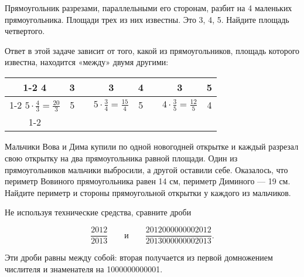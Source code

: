 \begin{itemize}

\itA Прямоугольник разрезами, параллельными его сторонам, разбит на 4 маленьких прямоугольника. Площади трех из них известны. Это 3, 4, 5. Найдите площадь четвертого.

\itr Ответ в этой задаче зависит от того, какой из прямоугольников, площадь которого известна, находится «между» двумя другими:

\def\lins{\cline{1-2} \cline{4-5} \cline{7-8}}
\begin{center} \begin{tabular}{|c|c|c|c|c|c|c|c|}
	\lins
	4 & 3 & \hspace{0.8cm} & 3 & 4 & \hspace{0.8cm} & 3 & 5 \\ \lins
	$5 \cdot \tfrac{4}{3} = \tfrac{20}{3}$ & 5 & &
	$5 \cdot \tfrac{3}{4} = \tfrac{15}{4}$ & 5 & &
	$4 \cdot \tfrac{3}{5} = \tfrac{12}{5}$ & 4 \\ \lins
\end{tabular} \end{center}

\itB Мальчики Вова и Дима купили по одной новогодней открытке и каждый разрезал свою открытку на два прямоугольника равной площади. Один из прямоугольников мальчики выбросили, а другой оставили себе. Оказалось, что периметр Вовиного прямоугольника равен 14 см, периметр Диминого — 19 см. Найдите периметр и стороны прямоугольной открытки у каждого из мальчиков.

\end{itemize}


\begin{itemize}

\itA Не используя технические средства, сравните дроби

$$
\frac{2012}{2013}\qquad\text{и}\qquad\frac{2012000000002012}{2013000000002013}.
$$

\itr Эти дроби равны между собой: вторая получается из первой домножением числителя и знаменателя на 1000000000001.

\bigbreak\noindent

\end{itemize}


